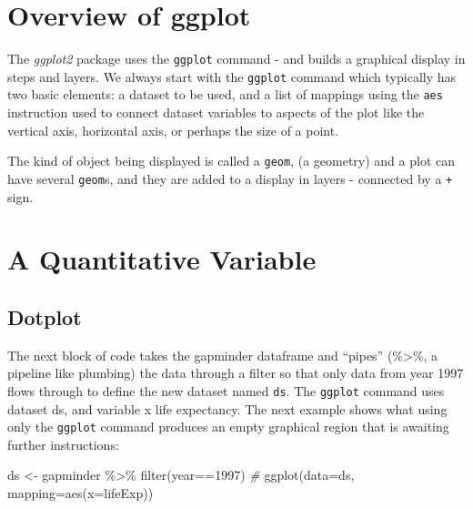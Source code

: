 \documentclass[
]{book}
\newenvironment{Shaded}{\begin{snugshade}}{\end{snugshade}}
\newcommand{\AttributeTok}[1]{\textcolor[rgb]{0.77,0.63,0.00}{#1}}
\newcommand{\CommentTok}[1]{\textcolor[rgb]{0.56,0.35,0.01}{\textit{#1}}}
\newcommand{\DecValTok}[1]{\textcolor[rgb]{0.00,0.00,0.81}{#1}}
\newcommand{\FunctionTok}[1]{\textcolor[rgb]{0.00,0.00,0.00}{#1}}
\newcommand{\NormalTok}[1]{#1}
\newcommand{\OtherTok}[1]{\textcolor[rgb]{0.56,0.35,0.01}{#1}}
\newcommand{\SpecialCharTok}[1]{\textcolor[rgb]{0.00,0.00,0.00}{#1}}
\begin{document}
\hypertarget{overview-of-ggplot}{%
\section{Overview of ggplot}\label{overview-of-ggplot}}

The \emph{ggplot2} package uses the \texttt{ggplot} command - and builds a graphical display in steps and layers. We always start with the \texttt{ggplot} command which typically has two basic elements: a dataset to be used, and a list of mappings using the \texttt{aes} instruction used to connect dataset variables to aspects of the plot like the vertical axis, horizontal axis, or perhaps the size of a point.

The kind of object being displayed is called a \texttt{geom}, (a geometry) and a plot can have several \texttt{geom}s, and they are added to a display in layers - connected by a \texttt{+} sign.

\hypertarget{a-quantitative-variable}{%
\section{A Quantitative Variable}\label{a-quantitative-variable}}

\hypertarget{dotplot}{%
\subsection{Dotplot}\label{dotplot}}

The next block of code takes the gapminder dataframe and ``pipes'' (\%\textgreater\%, a pipeline like plumbing) the data through a filter so that only data from year 1997 flows through to define the new dataset named \texttt{ds}. The \texttt{ggplot} command uses dataset ds, and variable x life expectancy. The next example shows what using only the \texttt{ggplot} command produces an empty graphical region that is awaiting further instructions:

\begin{Shaded}
\begin{Highlighting}[]
\NormalTok{ds }\OtherTok{\textless{}{-}}\NormalTok{ gapminder }\SpecialCharTok{\%\textgreater{}\%} 
  \FunctionTok{filter}\NormalTok{(year}\SpecialCharTok{==}\DecValTok{1997}\NormalTok{) }
\CommentTok{\#}
\FunctionTok{ggplot}\NormalTok{(}\AttributeTok{data=}\NormalTok{ds, }\AttributeTok{mapping=}\FunctionTok{aes}\NormalTok{(}\AttributeTok{x=}\NormalTok{lifeExp)) }
\end{Highlighting}
\end{Shaded}
\end{document}
